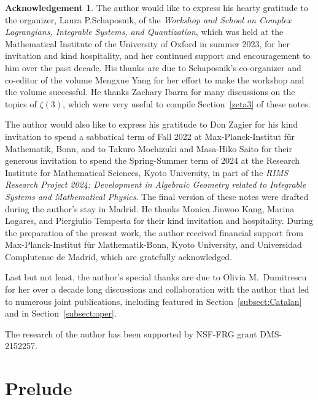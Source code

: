 \documentclass{amsart}
\theoremstyle{definition}
\newtheorem*{ack}{Acknowledgement}
\numberwithin{equation}{section}
\numberwithin{figure}{section}
\begin{document}
\begin{ack}
The author would like to express his
hearty gratitude to  the organizer, Laura P.\;Schaposnik, of the
\emph{Workshop and School on Complex Lagrangians, Integrable Systems, and Quantization}, which was 
held at the Mathematical Institute of the University of Oxford
 in summer 2023,  for her invitation and kind hospitality, and her continued support and encouragement
 to him over the past decade.
 His thanks are  due to Schaposnik's 
co-organizer and co-editor of the volume  Mengxue Yang
  for her
effort to make the workshop and the volume successful. 
He thanks Zachary Ibarra for many  discussions on the topics of 
$\zeta(3)$, which were very useful to compile 
Section~\ref{zeta3} of these notes.

The author  would also  like to express his  gratitude to Don Zagier for 
his kind invitation to spend a sabbatical term of Fall 2022 at 
Max-Planck-Institut f\"ur Mathematik, Bonn, and to 
Takuro Mochizuki and Masa-Hiko Saito for their generous invitation 
to spend the Spring-Summer term of 2024
at the Research Institute for Mathematical Sciences, Kyoto University,
in part of the \emph{RIMS Research Project 2024: Development in Algebraic Geometry related to Integrable Systems and Mathematical Physics}. 
The final version of these notes were drafted  
during the author's stay in Madrid. He thanks 
Monica Jinwoo Kang, Marina Logares, and Piergiulio Tempesta 
for their kind invitation and hospitality. During the preparation of the present work, the author received financial
support from Max-Planck-Institut f\"ur Mathematik-Bonn,
Kyoto University, and Universidad Complutense de Madrid,
which are gratefully acknowledged. 

Last but not least, the author's 
special thanks are due to Olivia M.~Dumitrescu for her over a decade
long discussions and collaboration with the author that led to numerous joint 
publications, including \cite{DMSS} featured in Section~\ref{subsect:Catalan} and \cite{OM5} in Section~\ref{subsect:oper}.

The research 
of the author has been supported by NSF-FRG grant DMS-2152257.
\end{ack}








\section{Prelude}
\label{sect:prelude}
\end{document}

